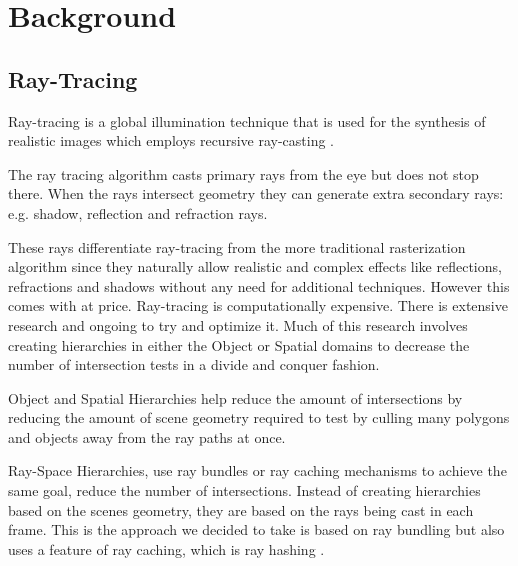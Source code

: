 
\chapter{Background}
\label{chapter:background}

\section{Ray-Tracing}
\label{section:background_ray_tracing}

Ray-tracing \cite{Whitted80} is a global illumination \cite{Ritschel12} technique that is used for the synthesis of realistic images which employs recursive ray-casting \cite{Appel68}.

The ray tracing algorithm casts primary rays from the eye but does not stop there. 
When the rays intersect geometry they can generate extra secondary rays: e.g. shadow, reflection and refraction rays.

These rays differentiate ray-tracing from the more traditional rasterization algorithm since they naturally allow realistic and complex effects like reflections, refractions and shadows without any need for additional techniques. However this comes with at price. Ray-tracing is computationally expensive. There is extensive research and ongoing to try and optimize it. Much of this research involves creating hierarchies in either the Object or Spatial domains to decrease the number of intersection tests in a divide and conquer fashion.

Object and Spatial Hierarchies help reduce the amount of intersections by reducing the amount of scene geometry required to test by culling many polygons and objects away from the ray paths at once.

Ray-Space Hierarchies, use ray bundles or ray caching mechanisms to achieve the same goal, reduce the number of intersections. Instead of creating hierarchies based on the scenes geometry, they are based on the rays being cast in each frame. This is the approach we decided to take is based on ray bundling but also uses a feature of ray caching, which is ray hashing \cite{Arvo87} \cite{Aila10}.


